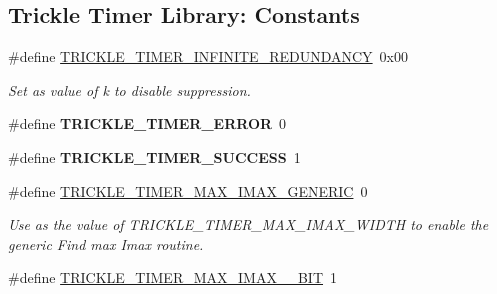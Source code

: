 \subsection*{Trickle Timer Library\+: Constants}
\begin{DoxyCompactItemize}
\item 
\hypertarget{group__trickle-timer_ga72117b57dd1e192ca8a016055d2310f3}{}\#define \hyperlink{group__trickle-timer_ga72117b57dd1e192ca8a016055d2310f3}{T\+R\+I\+C\+K\+L\+E\+\_\+\+T\+I\+M\+E\+R\+\_\+\+I\+N\+F\+I\+N\+I\+T\+E\+\_\+\+R\+E\+D\+U\+N\+D\+A\+N\+C\+Y}~0x00\label{group__trickle-timer_ga72117b57dd1e192ca8a016055d2310f3}

\begin{DoxyCompactList}\small\item\em Set as value of k to disable suppression. \end{DoxyCompactList}\item 
\hypertarget{group__trickle-timer_gac24600ceec4a0dc4b57df1baeb4b876d}{}\#define {\bfseries T\+R\+I\+C\+K\+L\+E\+\_\+\+T\+I\+M\+E\+R\+\_\+\+E\+R\+R\+O\+R}~0\label{group__trickle-timer_gac24600ceec4a0dc4b57df1baeb4b876d}

\item 
\hypertarget{group__trickle-timer_ga8075209f39b5756f0eb5c4ec4b8136e2}{}\#define {\bfseries T\+R\+I\+C\+K\+L\+E\+\_\+\+T\+I\+M\+E\+R\+\_\+\+S\+U\+C\+C\+E\+S\+S}~1\label{group__trickle-timer_ga8075209f39b5756f0eb5c4ec4b8136e2}

\item 
\hypertarget{group__trickle-timer_ga63607c0782cac7d825d07bff8c89b3d4}{}\#define \hyperlink{group__trickle-timer_ga63607c0782cac7d825d07bff8c89b3d4}{T\+R\+I\+C\+K\+L\+E\+\_\+\+T\+I\+M\+E\+R\+\_\+\+M\+A\+X\+\_\+\+I\+M\+A\+X\+\_\+\+G\+E\+N\+E\+R\+I\+C}~0\label{group__trickle-timer_ga63607c0782cac7d825d07bff8c89b3d4}

\begin{DoxyCompactList}\small\item\em Use as the value of T\+R\+I\+C\+K\+L\+E\+\_\+\+T\+I\+M\+E\+R\+\_\+\+M\+A\+X\+\_\+\+I\+M\+A\+X\+\_\+\+W\+I\+D\+T\+H to enable the generic \textquotesingle{}Find max Imax\textquotesingle{} routine. \end{DoxyCompactList}\item 
\hypertarget{group__trickle-timer_ga41b658ea4619c5e104efb050f664e3f1}{}\#define \hyperlink{group__trickle-timer_ga41b658ea4619c5e104efb050f664e3f1}{T\+R\+I\+C\+K\+L\+E\+\_\+\+T\+I\+M\+E\+R\+\_\+\+M\+A\+X\+\_\+\+I\+M\+A\+X\+\_\+\_\+\+B\+I\+T}~1\label{group__trickle-timer_ga41b658ea4619c5e104efb050f664e3f1}


\end{DoxyCompactItemize}
